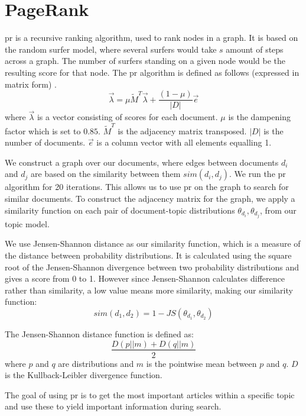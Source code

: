 \section{PageRank}\label{sec:pagerank}
\gls{pr} is a recursive ranking algorithm, used to rank nodes in a graph.
It is based on the random surfer model, where several surfers would take $s$ amount of steps across a graph.
The number of surfers standing on a given node would be the resulting score for that node.
The \gls{pr} algorithm is defined as follows (expressed in matrix form) \cite{ClusterPageRank}.
\begin{equation}
	\overrightarrow{\lambda} = \mu \widetilde{M}^T \overrightarrow{\lambda} + \frac{(1-\mu)}{|D|} \overrightarrow{e}
\end{equation}
where $\overrightarrow{\lambda}$ is a vector consisting of scores for each document. 
$\mu$ is the dampening factor which is set to $0.85$.
$\widetilde{M}^T$ is the adjacency matrix transposed.
$|D|$ is the number of documents.
$\overrightarrow{e}$ is a column vector with all elements equalling 1.

We construct a graph over our documents, where edges between documents $d_i$ and $d_j$ are based on the similarity between them $sim(d_i, d_j)$.
We run the \gls{pr} algorithm for 20 iterations.
This allows us to use \gls{pr} on the graph to search for similar documents.
To construct the adjacency matrix for the graph, we apply a similarity function on each pair of document-topic distributions $\theta_{d_i}, \theta_{d_j}$, from our topic model.

We use Jensen-Shannon distance as our similarity function, which is a measure of the distance between probability distributions\cite{jensen-shannon2003}\cite{jensen-shannondis2003}.
It is calculated using the square root of the Jensen-Shannon divergence between two probability distributions and gives a score from 0 to 1.
However since Jensen-Shannon calculates difference rather than similarity, a low value means more similarity, making our similarity function:
\begin{equation}
	sim(d_1, d_2) = 1 - JS(\theta_{d_1}, \theta_{d_2})
\end{equation}

The Jensen-Shannon distance function is defined as:
\begin{equation}
	\frac{D(p || m) + D(q || m)}{2}
\end{equation}
where $p$ and $q$ are distributions and $m$ is the pointwise mean between $p$ and $q$. 
$D$ is the Kullback-Leibler divergence function.

The goal of using \gls{pr} is to get the most important articles within a specific topic and use these to yield important information during search.  
